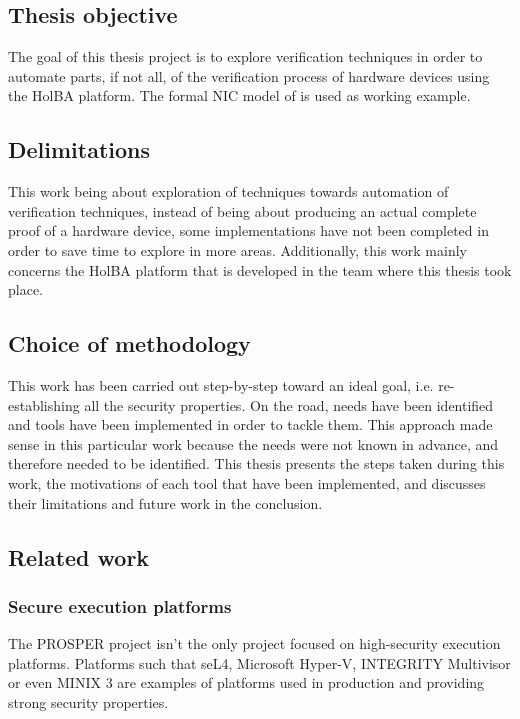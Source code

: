 \documentclass[10pt,a4paper]{article}
\begin{document}
\begin{multicols}{2}
\subsection{Thesis objective}

The goal of this thesis project is to explore verification techniques in order to automate parts, if not all, of the verification process of hardware devices using the HolBA platform. The formal {NIC} model of \cite{haglund_formal_2016} is used as working example.

\subsection{Delimitations}

This work being about exploration of techniques towards automation of verification techniques, instead of being about producing an actual complete proof of a hardware device, some implementations have not been completed in order to save time to explore in more areas. Additionally, this work mainly concerns the HolBA platform that is developed in the team where this thesis took place.

\subsection{Choice of methodology}

This work has been carried out step-by-step toward an ideal goal, i.e. re-establishing all the security properties. On the road, needs have been identified and tools have been implemented in order to tackle them. This approach made sense in this particular work because the needs were not known in advance, and therefore needed to be identified. This thesis presents the steps taken during this work, the motivations of each tool that have been implemented, and discusses their limitations and future work in the conclusion.

\subsection{Related work}

\subsubsection{Secure execution platforms}

The {PROSPER} project isn't the only project focused on high-security execution platforms. Platforms such that seL4, Microsoft Hyper-V, INTEGRITY Multivisor or even MINIX 3 are examples of platforms used in production and providing strong security properties.


\end{multicols}
\end{document}
